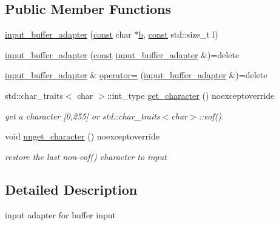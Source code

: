 \subsection*{Public Member Functions}
\begin{DoxyCompactItemize}
\item 
\hyperlink{classnlohmann_1_1detail_1_1input__buffer__adapter_aee9d094d369bcd8f110eae4a175a8fa9}{input\+\_\+buffer\+\_\+adapter} (\hyperlink{functions__c_8js_afacfd9c985d225bb07483b887a801b6f}{const} char $\ast$\hyperlink{jquery_8js_a2fa551895933fae935a0a6b87282241d}{b}, \hyperlink{functions__c_8js_afacfd9c985d225bb07483b887a801b6f}{const} std\+::size\+\_\+t l)
\item 
\hyperlink{classnlohmann_1_1detail_1_1input__buffer__adapter_ada76d7b75c5d6b989af0e18687ef07b6}{input\+\_\+buffer\+\_\+adapter} (\hyperlink{functions__c_8js_afacfd9c985d225bb07483b887a801b6f}{const} \hyperlink{classnlohmann_1_1detail_1_1input__buffer__adapter}{input\+\_\+buffer\+\_\+adapter} \&)=delete
\item 
\hyperlink{classnlohmann_1_1detail_1_1input__buffer__adapter}{input\+\_\+buffer\+\_\+adapter} \& \hyperlink{classnlohmann_1_1detail_1_1input__buffer__adapter_a0871125057d993684ba8e45fb2b8a76b}{operator=} (\hyperlink{classnlohmann_1_1detail_1_1input__buffer__adapter}{input\+\_\+buffer\+\_\+adapter} \&)=delete
\item 
std\+::char\+\_\+traits$<$ char $>$\+::int\+\_\+type \hyperlink{classnlohmann_1_1detail_1_1input__buffer__adapter_a3a8ded2e453b8372353aed38302f30f1}{get\+\_\+character} () noexceptoverride
\begin{DoxyCompactList}\small\item\em get a character \mbox{[}0,255\mbox{]} or std\+::char\+\_\+traits$<$char$>$\+::eof(). \end{DoxyCompactList}\item 
void \hyperlink{classnlohmann_1_1detail_1_1input__buffer__adapter_a428d0ad853394233bffb8ceae9871a63}{unget\+\_\+character} () noexceptoverride
\begin{DoxyCompactList}\small\item\em restore the last non-\/eof() character to input \end{DoxyCompactList}\end{DoxyCompactItemize}


\subsection{Detailed Description}
input adapter for buffer input 

